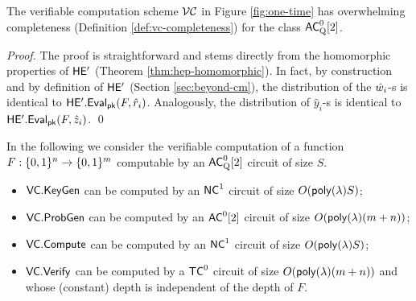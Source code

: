 \begin{lemma}[Completeness of $\VC$]
The verifiable computation scheme $\VC$ in Figure \ref{fig:one-time} has overwhelming completeness (Definition \ref{def:vc-completeness}) for the class ${\mathsf{AC}}^0_{\text{Q}}[2]$.
\end{lemma}
\begin{proof}
The proof is straightforward and stems directly from the homomorphic properties of $\mathsf{HE'}$ (Theorem \ref{thm:hep-homomorphic}).
In fact, by construction and by definition of $\mathsf{HE'}$ (Section \ref{sec:beyond-cm}), the distribution of the $\hat{w}_i$-s is identical to $\mathsf{HE'.Eval}_{\mathsf{pk}}(F, \hat{r}_i)$. Analogously, the distribution of $\hat{y}_i$-s is identical to $\mathsf{HE'.Eval}_{\mathsf{pk}}(F, \hat{z}_i)$. \qed
\end{proof}


\begin{remark}[Efficiency of $\VC$]
In the following we consider the verifiable computation of a function $F: \{0, 1\}^n \to \{0, 1\}^m$ computable by an ${\mathsf{AC}}^0_{\text{Q}}[2]$ circuit of size $S$.
\begin{itemize}
\item  $\mathsf{VC.KeyGen}$ can be computed by an ${\mathsf{NC}}^1$ circuit of size $O(\mathsf{poly}(\lambda)S)$; 
\item $\mathsf{VC.ProbGen}$ can be computed by an ${\mathsf{AC}}^0[2]$ circuit of size $O(\mathsf{poly}(\lambda)(m+n))$;
\item $\mathsf{VC.Compute}$ can be computed by an ${\mathsf{NC}}^1$ circuit of size $O(\mathsf{poly}(\lambda)S)$; 
\item $\mathsf{VC.Verify}$ can be computed by a ${\mathsf{TC}}^0$ circuit of size $O(\mathsf{poly}(\lambda)(m+n))$ and whose (constant) depth is independent of the depth of $F$.
\end{itemize}
\end{remark}

